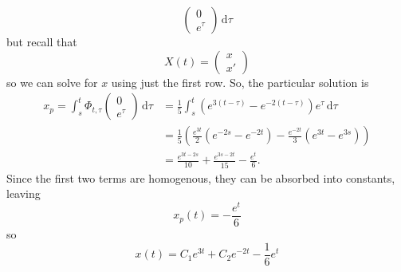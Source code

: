 \documentclass{exam}
\begin{document}
\begin{solution}
\[\begin{pmatrix}
            0 \\ e^{\tau}
        \end{pmatrix}\, \mathrm{d}\tau
    \]
    but recall that 
    \[
        X(t) = \begin{pmatrix}
            x \\ x'
        \end{pmatrix}
    \]
    so we can solve for $x$ using just the first row. So, the particular solution is 
    \begin{align*}
        x_p = \int_s^t \Phi_{t, \tau}\begin{pmatrix}
            0 \\ e^\tau
        \end{pmatrix}\,\mathrm{d}\tau &= \frac{1}{5}\int_{s}^{t} (e^{3(t-\tau)} - e^{-2(t-\tau)})e^\tau\,\mathrm{d}\tau \\
        &= \frac{1}{5}\left(\frac{e^{3t}}{2}(e^{-2s} - e^{-2t}) -\frac{e^{-2t}}{3}(e^{3t} - e^{3s})\right) \\
        &= \frac{e^{3t-2s}}{10} + \frac{e^{3s - 2t}}{15} - \frac{e^{t}}{6}.
    \end{align*}
    Since the first two terms are homogenous, they can be absorbed into constants, leaving 
    \[
        x_p(t) = -\frac{e^{t}}{6} 
    \]
    so
    \[
        \boxed{
            x(t) = C_1e^{3t} + C_2e^{-2t} - \frac{1}{6}e^t
        } 
    \]
\end{solution}
\end{document}
